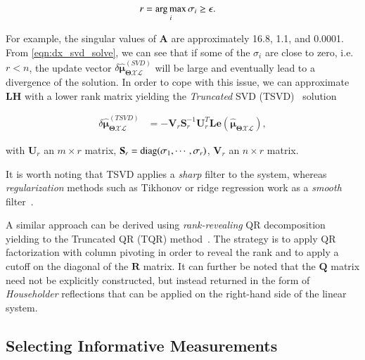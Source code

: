 \begin{equation}\label{eqn:numerical_rank}
  \begin{aligned}
  r &= \operatorname*{arg\,max}_i \sigma_i\geq\epsilon.
  \end{aligned}
\end{equation}

For example, the singular values of $\mathbf{A}$ are approximately 16.8, 1.1,
and 0.0001. From \eqref{eqn:dx_svd_solve}, we can see that if some of the
$\sigma_i$ are close to zero, i.e. $r<n$, the update vector
$\delta\hat{\boldsymbol{\mu}}_{\boldsymbol{\Theta}\mathcal{X}\mathcal{L}}^
{(SVD)}$ will be large and eventually lead to a divergence of the solution. In
order to cope with this issue, we can approximate $\mathbf{L}\mathbf{H}$ with a
lower rank matrix yielding the \emph{Truncated} SVD
(TSVD)~\cite{varah73numerical} solution

\begin{equation}\label{eqn:dx_tsvd_solve}
  \begin{aligned}
  \delta\hat{\boldsymbol{\mu}}_{\boldsymbol{\Theta}\mathcal{X}\mathcal{L}}^
    {(TSVD)} &=
    -\mathbf{V}_r\mathbf{S}_r^{-1}\mathbf{U}_r^T
    \mathbf{L}\mathbf{e}(
    \mathbf{\hat{\boldsymbol{\mu}}_{
    \boldsymbol{\Theta}\mathcal{X}\mathcal{L}}}),
  \end{aligned}
\end{equation}

\noindent with $\mathbf{U}_r$ an $m\times r$ matrix,
$\mathbf{S}_r=\operatorname{diag}(\sigma_1, \cdots,\sigma_r)$, $\mathbf{V}_r$ an $n\times r$
matrix.

It is worth noting that TSVD applies a \emph{sharp} filter to the system,
whereas \emph{regularization} methods such as Tikhonov or ridge regression work
as a \emph{smooth} filter~\cite{hansen87truncated}.

A similar approach can be derived using \emph{rank-revealing} QR
decomposition~\cite{hong92rank} yielding to the Truncated QR (TQR)
method~\cite{kitagawa01regularization}. The strategy is to apply QR
factorization with column pivoting in order to reveal the rank and to apply a
cutoff on the diagonal of the $\mathbf{R}$ matrix. It can further be noted that
the $\mathbf{Q}$ matrix need not be explicitly constructed, but instead returned
in the form of \emph{Householder} reflections that can be applied on the
right-hand side of the linear system.

\subsection{Selecting Informative Measurements}

